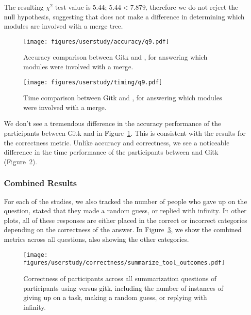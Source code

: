 The resulting $\chi^2$ test value is $5.44$; $5.44 < 7.879$, therefore
we do not reject the null hypothesis, suggesting that \tool does not
make a difference in determining which modules are involved with a merge
tree.

\begin{figure}[htpb]
  \centering
  \texttt{[image: figures/userstudy/accuracy/q9.pdf]}
  \caption{Accuracy comparison between Gitk and \tool, for answering
    which modules were involved with a merge.}
  \label{fig:q9_accuracy}
\end{figure}


\begin{figure}[htpb]
  \centering
  \texttt{[image: figures/userstudy/timing/q9.pdf]}
  \caption{Time comparison between Gitk and \tool, for answering which
    modules were involved with a merge.}
  \label{fig:q9_timing}
\end{figure}

We don't see a tremendous difference in the accuracy performance of the
participants between Gitk and \tool in Figure~\ref{fig:q9_accuracy}.
This is consistent with the results for the correctness metric. Unlike
accuracy and correctness, we see a noticeable difference in the time
performance of the participants between \tool and Gitk
(Figure~\ref{fig:q9_timing}).

\subsubsection{Combined Results}
\label{ssub:combined_results}

For each of the studies, we also tracked the number of people who gave
up on the question, stated that they made a random guess, or replied
with infinity. In other plots, all of these responses are either placed
in the correct or incorrect categories depending on the correctness of
the answer. In Figure~\ref{fig:summarization_correctness}, we show the
combined metrics across all questions, also showing the other
categories.

\begin{figure}[htpb]
  \centering
  \texttt{[image: figures/userstudy/correctness/summarize\_tool\_outcomes.pdf]}
  \caption{Correctness of participants across all summarization
    questions of participants using \tool versus gitk, including the
    number of instances of giving up on a task, making a random guess,
    or replying with infinity.}
  \label{fig:summarization_correctness}
\end{figure}


